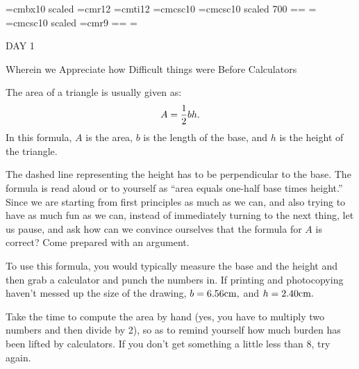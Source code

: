 
\def\folio{\ifnum\pageno>0 \number\pageno \else
   \ifnum\pageno<0 \romannumeral-\pageno \else\fi\fi}

\font\largebf=cmbx10  scaled 
\font\largerm=cmr12
\font\largeit=cmti12
\font\tensc=cmcsc10
\font\sevensc=cmcsc10 scaled 700
\newfam\scfam \def\sc{\fam\scfam\tensc}
\textfont\scfam=\tensc \scriptfont\scfam=\sevensc
\scriptscriptfont\scfam=\sevensc
\font\largesc=cmcsc10 scaled 
\font\ninerm=cmr9
\newfam\srfam \def\sr{\fam\srfam\ninerm}
\textfont\srfam=\ninerm \scriptfont\srfam=\sevenrm
\scriptscriptfont\srfam=\fiverm




\null\vskip36pt

\centerline{\largerm DAY 1}
\nobreak\bigskip

\centerline{\largeit Wherein we Appreciate how Difficult things were Before Calculators}
\nobreak\bigskip

\nobreak\bigskip

\noindent The area of a triangle is usually given as:
$$A={1\over 2} b h.$$ 
In this formula, $A$ is the area, $b$ is the length of the base, and $h$ is the height of the triangle.
\nobreak\bigskip

\midinsert
\centerline{}
\endinsert
\nobreak\bigskip

\noindent The dashed line representing the height has to be perpendicular to the base. The formula is read aloud or to yourself as ``area equals one-half base times height.''
Since we are starting from first principles as much as we can, and also trying to have as much fun as we can,
instead of immediately turning to the next thing, let us pause, and ask how can we convince ourselves that the formula for $A$ is correct? Come prepared with an argument.

To use this formula, you would typically measure the base and the height and then grab a calculator and punch the numbers in. If printing and photocopying haven't
messed up the size of the drawing, $b=6.56 {\rm cm},$ and $h=2.40 {\rm cm}.$

Take the time to compute the area by hand (yes, you have to multiply two numbers and then divide by 2), so as to remind yourself how much burden has been lifted by calculators.
If you don't get something a little less than 8, try again.

